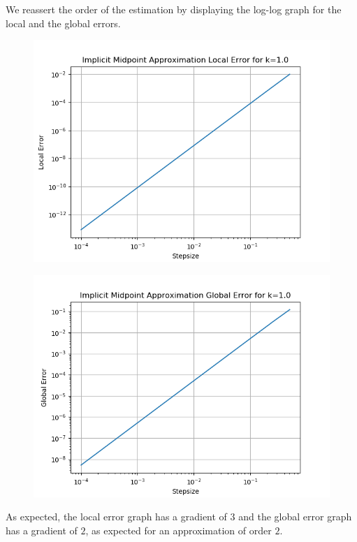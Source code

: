 \documentclass{article}
\theoremstyle{definition}
\begin{document}
\begin{itemize}
		We reassert the order of the estimation by displaying the
		log-log graph for the local and the global errors.
		\begin{figure}[H]
			\includegraphics[scale=0.6]{harmonic_mid_local_error}
		\end{figure}
		\begin{figure}[H]
			\includegraphics[scale=0.6]{harmonic_mid_global_error}
		\end{figure}
		As expected, the local error graph has a gradient of $3$ and the
		global error graph has a gradient of $2$, as expected for an
		approximation of order $2$.


\end{itemize}
\end{document}
